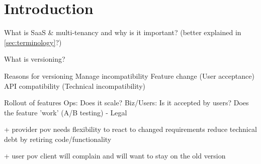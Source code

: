 \section{Introduction}

What is SaaS & multi-tenancy and why is it important? (better explained in \ref{sec:terminology}?)

What is versioning?

Reasons for versioning
  Manage incompatibility
    Feature change (User acceptance)
    API compatibility (Technical incompatibility)

  Rollout of features
    Ops: Does it scale?
    Biz/Users: Is it accepted by users? Does the feature 'work' (A/B testing)
  - Legal

  + provider pov
  needs flexibility to react to changed requirements
  reduce technical debt by retiring code/functionality

  + user pov
  client will complain and will want to stay on the old version
